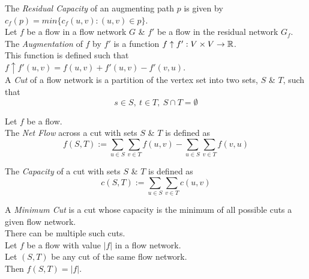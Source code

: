\documentclass[11pt,a4paper]{article}
\begin{document}
The \textit{Residual Capacity} of an augmenting path $p$ is given by $c_f(p)=min\{c_f(u,v):(u,v)\in p\}$.\\

Let $f$ be a flow in a flow network $G$ \& $f'$ be a flow in the residual network $G_f$.\\
The \textit{Augmentation} of $f$ by $f'$ is a function $f\uparrow f':V\times V\to\mathbb{R}$.\\
This function is defined such that $f\uparrow f'(u,v)=f(u,v)+f'(u,v)-f'(v,u)$.\\

A \textit{Cut} of a flow network is a partition of the vertex set into two sets, $S$ \& $T$, such that $$s\in S,\ t\in T,\ S\cap T=\emptyset$$

Let $f$ be a flow.\\
The \textit{Net Flow} across a cut with sets $S$ \& $T$ is defined as
$$f(S,T):=\sum_{u\in S}\sum_{v\in T}f(u,v)-\sum_{u\in S}\sum_{v\in T}f(v,u)$$

The \textit{Capacity} of a cut with sets $S$ \& $T$ is defined as
$$c(S,T):=\sum_{u\in S}\sum_{v\in T}c(u,v)$$

A \textit{Minimum Cut} is a cut whose capacity is the minimum of all possible cuts a given flow network.\\
\nb There can be multiple such cuts.\\

Let $f$ be a flow with value $|f|$ in a flow network.\\
Let $(S,T)$ be any cut of the same flow network.\\
Then $f(S,T)=|f|$.\\
\end{document}
